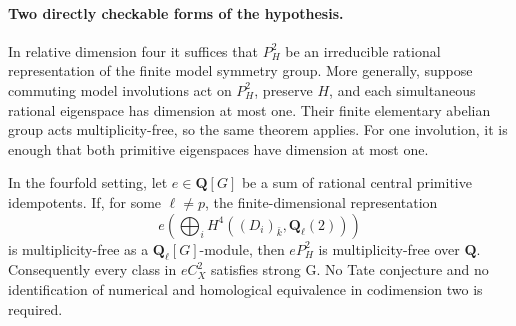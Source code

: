 \paragraph{Two directly checkable forms of the hypothesis.}
In relative dimension four it suffices that $P_H^2$ be an
irreducible rational representation of the finite model
symmetry group.  More generally, suppose commuting model
involutions act on $P_H^2$, preserve $H$, and each simultaneous
rational eigenspace has dimension at most one.  Their finite
elementary abelian group acts multiplicity-free, so the
same theorem applies.  For one involution, it is enough
that both primitive eigenspaces have dimension at most one.

\begin{proposition}
\label{r16sym:cohomological-certificate}
In the fourfold setting, let $e\in\mathbf Q[G]$ be a sum of
rational central primitive idempotents.  If, for some
$\ell\ne p$, the finite-dimensional representation
\[
       e\left(\bigoplus_i
          H^4((D_i)_{\bar k},\mathbf Q_\ell(2))\right)
\tag{ER16.9}\label{r16sym:cohom-representation}
\]
is multiplicity-free as a $\mathbf Q_\ell[G]$-module,
then $eP_H^2$ is multiplicity-free over $\mathbf Q$.
Consequently every class in $eC_X^2$ satisfies strong G.
No Tate conjecture and no identification of numerical
and homological equivalence in codimension two is required.
\end{proposition}

